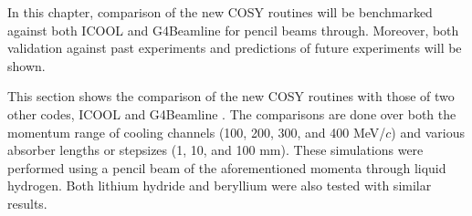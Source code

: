 \par In this chapter, comparison of the new COSY routines will be benchmarked against both ICOOL and G4Beamline for pencil beams through. Moreover, both validation against past experiments and predictions of future experiments will be shown.

\label{sec:benchmark}

This section shows the comparison of the new COSY routines with those of two other codes, ICOOL \cite{icool} and G4Beamline \cite{g4bl}. The comparisons are done over both the momentum range of cooling channels (100, 200, 300, and 400 MeV/$c$) and various absorber lengths or stepsizes (1, 10, and 100 mm). These simulations were performed using a pencil beam of the aforementioned momenta through liquid hydrogen. Both lithium hydride and beryllium were also tested with similar results.

\newpage

\iftrue %


